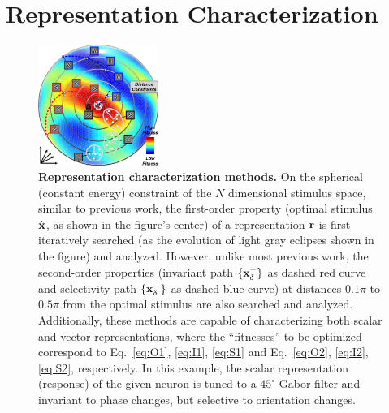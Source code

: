 \documentclass[10pt,twocolumn,letterpaper]{article}
\begin{document}
\section{Representation Characterization}

\begin{figure}
\begin{center}
\includegraphics[width=0.35\textwidth]{Figs/methods.pdf} 
\end{center}
\caption{{\bf Representation characterization methods.}
On the spherical (\ie constant energy) constraint of the $N$ dimensional stimulus space, similar to previous work, the first-order property (\ie optimal stimulus $\hat{\bf{x}}$, as shown in the figure's center) of a representation $\bf{r}$ is first iteratively searched (as the evolution of light gray eclipses shown in the figure) and analyzed.
However, unlike most previous work, the second-order properties (\ie invariant path $\lbrace \bf{x}^{+}_{\delta} \rbrace$ as dashed red curve and selectivity path $\lbrace \bf{x}^{-}_{\delta} \rbrace$ as dashed blue curve) at distances $0.1\pi$ to $0.5\pi$ from the optimal stimulus are also searched and analyzed.
Additionally, these methods are capable of characterizing both scalar and vector representations, where the ``fitnesses'' to be optimized correspond to Eq.~\ref{eq:O1}, \ref{eq:I1}, \ref{eq:S1} and Eq.~\ref{eq:O2}, \ref{eq:I2}, \ref{eq:S2}, respectively.
In this example, the scalar representation (\ie response) of the given neuron is tuned to a $45^{\circ}$ Gabor filter and invariant to phase changes, but selective to orientation changes.
}
\label{fig:methods}
\end{figure}

\end{document}
